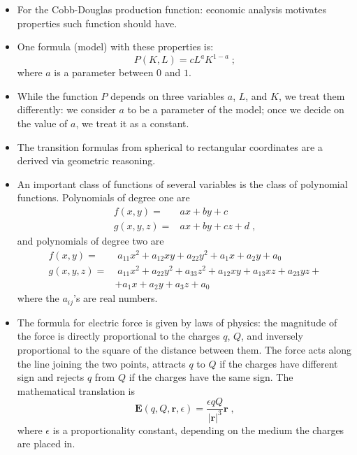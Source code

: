 \begin{frame}
\begin{itemize}
\item For the Cobb-Douglas production function: economic analysis motivates properties such function should have. 
\item One formula (model) with these properties is:
\[
P(K,L) = cL^a K^{1-a}\; ;
\]
where $a$ is a parameter between $0$ and $1$. 
\item While the function $P$ depends on three variables $a$, $L$, and $K$, we treat them differently: we consider $a$ to be a parameter of the model; once we decide on the value of $a$, we treat it as a constant.
\item The transition formulas from spherical to rectangular coordinates are a derived via geometric reasoning.
\end{itemize}
\end{frame}

\begin{frame}
\begin{itemize}
\item An important class of functions of several variables is the class of polynomial functions. Polynomials of degree one are
\begin{align*}
f(x,y) = & ax+by+c \\
g(x,y,z) = & ax+by+cz+d  \; ,
\end{align*}
and polynomials of degree two are
\begin{align*}
f(x,y) = & \; a_{11}x^2+a_{12}xy+a_{22}y^2+ a_1 x + a_2 y + a_0 \\
g(x,y,z) = & \; a_{11} x^2 + a_{22}y^2 + a_{33}z^2 + a_{12}xy + a_{13}xz+a_{23}yz + \\
& + a_1 x + a_2 y + a_3 z + a_0
\end{align*}
where the $a_{ij}$'s are real numbers.
\end{itemize}
\end{frame}
\begin{frame}
\begin{itemize}
\item The formula for electric force is given by laws of physics: the magnitude of the force is directly proportional to the charges $q$, $Q$, and inversely proportional to the square of the distance between them. The force acts along the line joining the two points, attracts $q$ to $Q$ if the charges have different sign and rejects $q$ from $Q$ if the charges have the same sign. The mathematical translation is
\[
\textbf{E}(q, Q, \textbf{r}, \epsilon) = \frac{\epsilon q Q}{|\textbf{r}|^3} \textbf{r}\; ,
\]
where $\epsilon$ is a proportionality constant, depending on the medium the charges are placed in.
\end{itemize}
\end{frame}
